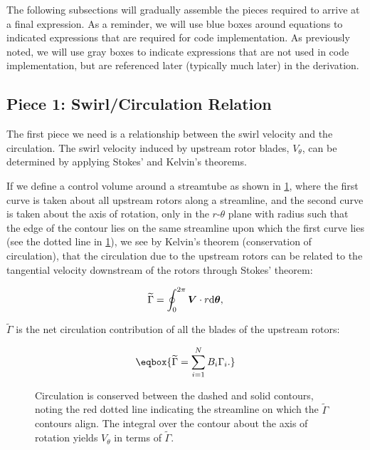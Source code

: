 The following subsections will gradually assemble the pieces required to arrive at a final expression.
%
As a reminder, we will use blue boxes around equations to indicated expressions that are required for code implementation.
%
As previously noted, we will use gray boxes to indicate expressions that are not used in code implementation, but are referenced later (typically much later) in the derivation.


\subsection{Piece 1: Swirl/Circulation Relation}

The first piece we need is a relationship between the swirl velocity and the circulation.
%
The swirl velocity induced by upstream rotor blades, \(V_\theta\), can be determined by applying Stokes' and Kelvin's theorems.



%
If we define a control volume around a streamtube as shown in  \cref{fig:circulationsum}, where the first curve is taken about all upstream rotors along a streamline, and the second curve is taken about the axis of rotation, only in the \(r\)-\(\theta\) plane with radius such that the edge of the contour lies on the same streamline upon which the first curve lies (see the dotted line in \cref{fig:circulationsum}), we see by Kelvin's theorem (conservation of circulation), that the circulation due to the upstream rotors can be related to the tangential velocity downstream of the rotors through Stokes' theorem:

\begin{equation}
    \widetilde{\Gamma} = \oint_0^{2\pi} \bm{V} \cdot r \mathrm{d} \bm{\theta},
\end{equation}

\where \(\widetilde{\Gamma}\) is the net circulation contribution of all the blades of the upstream rotors:

\begin{equation}
    \label{eqn:gamma_tilde}
    \eqbox{
        \widetilde{\Gamma} = \sum_{i=1}^N B_i \Gamma_i.
    }
\end{equation}


\begin{figure}[h!]
    \centering
    
    \caption[Conservation of circulation.]{Circulation is conserved between the dashed and solid contours, noting the red dotted line indicating the streamline on which the \(\widetilde{\Gamma}\) contours align. The integral over the contour about the axis of rotation yields \(V_\theta\) in terms of \(\widetilde{\Gamma}\).}
    \label{fig:circulationsum}
\end{figure}

